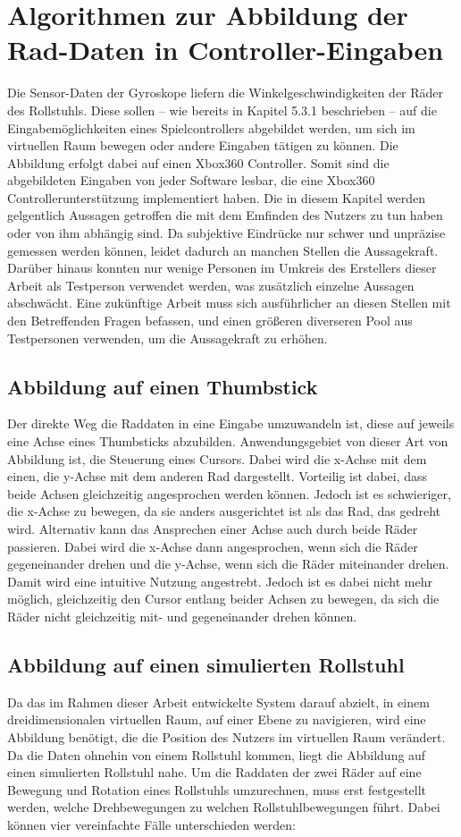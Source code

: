 \section{Algorithmen zur Abbildung der Rad-Daten in Controller-Eingaben}
Die Sensor-Daten der Gyroskope liefern die Winkelgeschwindigkeiten der Räder des Rollstuhls.
Diese sollen – wie bereits in Kapitel 5.3.1 beschrieben – auf die Eingabemöglichkeiten eines Spielcontrollers abgebildet werden, um sich im virtuellen Raum bewegen oder andere Eingaben tätigen zu können.
Die Abbildung erfolgt dabei auf einen Xbox360 Controller. Somit sind die abgebildeten Eingaben von jeder Software lesbar, die eine Xbox360 Controllerunterstützung implementiert haben.
Die in diesem Kapitel werden gelgentlich Aussagen getroffen die mit dem Emfinden des Nutzers zu tun haben oder von ihm abhängig sind.
Da subjektive Eindrücke nur schwer und unpräzise gemessen werden können, leidet dadurch an manchen Stellen die Aussagekraft.
Darüber hinaus konnten nur wenige Personen im Umkreis des Erstellers dieser Arbeit als Testperson verwendet werden, was zusätzlich einzelne Aussagen abschwächt.
Eine zukünftige Arbeit muss sich ausführlicher an diesen Stellen mit den Betreffenden Fragen befassen, und einen größeren diverseren Pool aus Testpersonen verwenden, um die Aussagekraft zu erhöhen.

\subsection{Abbildung auf einen Thumbstick}
Der direkte Weg die Raddaten in eine Eingabe umzuwandeln ist, diese auf jeweils eine Achse eines Thumbsticks abzubilden.
Anwendungsgebiet von dieser Art von Abbildung ist, die Steuerung eines Cursors.
Dabei wird die x-Achse mit dem einen, die y-Achse mit dem anderen Rad dargestellt.
Vorteilig ist dabei, dass beide Achsen gleichzeitig angesprochen werden können.
Jedoch ist es schwieriger, die x-Achse zu bewegen, da sie anders ausgerichtet ist als das Rad, das gedreht wird.
Alternativ kann das Ansprechen einer Achse auch durch beide Räder passieren.
Dabei wird die x-Achse dann angesprochen, wenn sich die Räder gegeneinander drehen und die y-Achse, wenn sich die Räder miteinander drehen.
Damit wird eine intuitive Nutzung angestrebt.
Jedoch ist es dabei nicht mehr möglich, gleichzeitig den Cursor entlang beider Achsen zu bewegen, da sich die Räder nicht gleichzeitig mit- und gegeneinander drehen können.

\subsection{Abbildung auf einen simulierten Rollstuhl}
Da das im Rahmen dieser Arbeit entwickelte System darauf abzielt, in einem dreidimensionalen virtuellen Raum, auf einer Ebene zu navigieren, wird eine Abbildung benötigt, die die Position des Nutzers im virtuellen Raum verändert.
Da die Daten ohnehin von einem Rollstuhl kommen, liegt die Abbildung auf einen simulierten Rollstuhl nahe.
Um die Raddaten der zwei Räder auf eine Bewegung und Rotation eines Rollstuhls umzurechnen, muss erst festgestellt werden, welche Drehbewegungen zu welchen Rollstuhlbewegungen führt.
Dabei können vier vereinfachte Fälle unterschieden werden:

